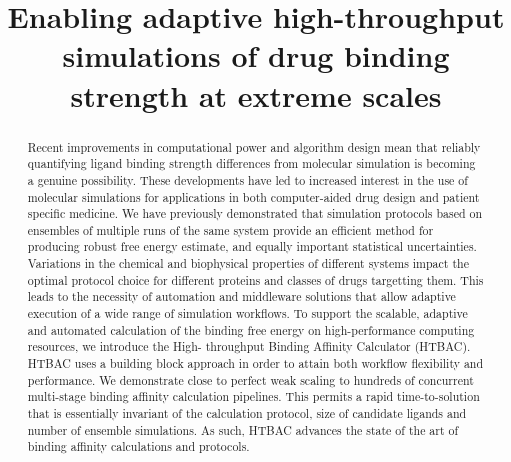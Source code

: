 \documentclass{llncs}
\title{Enabling adaptive high-throughput simulations of drug binding strength at extreme scales}
\begin{document}
\maketitle





\begin{abstract}
Recent improvements in computational power and algorithm design mean that
reliably quantifying ligand binding strength differences from molecular
simulation is becoming a genuine possibility. These developments have led to
increased interest in the use of molecular simulations for applications in both
computer-aided drug design and patient specific medicine. We have previously
demonstrated that simulation protocols based on ensembles of multiple runs of
the same system provide an efficient method for producing robust free energy
estimate, and equally important statistical uncertainties. Variations in the
chemical and biophysical properties of different systems impact the optimal
protocol choice for different proteins and classes of drugs targetting them.
This leads to the necessity of automation and middleware solutions that allow
adaptive execution of a wide range of simulation workflows. To support the
scalable, adaptive and automated calculation of the binding free energy on
high-performance computing resources, we introduce the High- throughput Binding
Affinity Calculator (HTBAC). HTBAC uses a building block approach in order to
attain both workflow flexibility and performance. We demonstrate close to
perfect weak scaling to hundreds of concurrent multi-stage binding affinity
calculation pipelines. This permits a rapid time-to-solution that is
essentially invariant of the calculation protocol, size of candidate ligands
and number of ensemble simulations. As such, HTBAC advances the state of the
art of binding affinity calculations and protocols.

\end{abstract}



\maketitle
\end{document}
